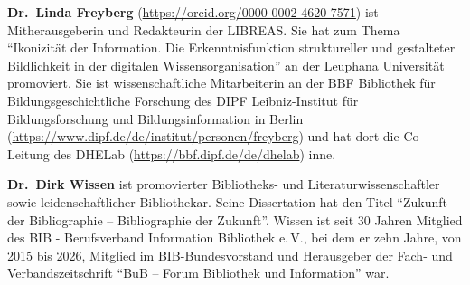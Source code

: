 \documentclass[a4paper,
fontsize=11pt,
oneside,
numbers=noperiodatend,
parskip=half-,
bibliography=totoc,
final
]{scrartcl}
\begin{document}
\textbf{Dr.~Linda Freyberg}
(\url{https://orcid.org/0000-0002-4620-7571}) ist Mitherausgeberin und
Redakteurin der LIBREAS. Sie hat zum Thema \enquote{Ikonizität der Information.
Die Erkenntnisfunktion struktureller und gestalteter Bildlichkeit in der
digitalen Wissensorganisation} an der Leuphana Universität promoviert.
Sie ist wissenschaftliche Mitarbeiterin an der BBF \textbar{} Bibliothek
für Bildungsgeschichtliche Forschung des DIPF \textbar{}
Leibniz-Institut für Bildungsforschung und Bildungsinformation in Berlin
(\url{https://www.dipf.de/de/institut/personen/freyberg}) und hat dort
die Co-Leitung des DHELab (\url{https://bbf.dipf.de/de/dhelab}) inne.

\textbf{Dr.~Dirk Wissen} ist promovierter Bibliotheks- und
Literaturwissenschaftler sowie leidenschaftlicher Bibliothekar. Seine
Dissertation hat den Titel \enquote{Zukunft der Bibliographie -- Bibliographie
der Zukunft}. Wissen ist seit 30 Jahren Mitglied des BIB -
Berufsverband Information Bibliothek e.\,V., bei dem er zehn Jahre, von
2015 bis 2026, Mitglied im BIB-Bundesvorstand und Herausgeber der Fach-
und Verbandszeitschrift \enquote{BuB -- Forum Bibliothek und Information} war.
\end{document}
